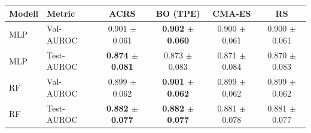 \begin{tabular}{llcccc}
\toprule
Modell & Metric & ACRS & BO (TPE) & CMA-ES & RS \\
\midrule
MLP & Val-AUROC & 0.901 $\pm$ 0.061 & \textbf{0.902 $\pm$ 0.060} & 0.900 $\pm$ 0.061 & 0.900 $\pm$ 0.061 \\
MLP & Test-AUROC & \textbf{0.874 $\pm$ 0.081} & 0.873 $\pm$ 0.083 & 0.871 $\pm$ 0.084 & 0.870 $\pm$ 0.083 \\
\midrule
RF & Val-AUROC & 0.899 $\pm$ 0.062 & \textbf{0.901 $\pm$ 0.062} & 0.899 $\pm$ 0.062 & 0.899 $\pm$ 0.062 \\
RF & Test-AUROC & \textbf{0.882 $\pm$ 0.077} & \textbf{0.882 $\pm$ 0.077} & 0.881 $\pm$ 0.078 & 0.881 $\pm$ 0.077 \\
\bottomrule
\end{tabular}
